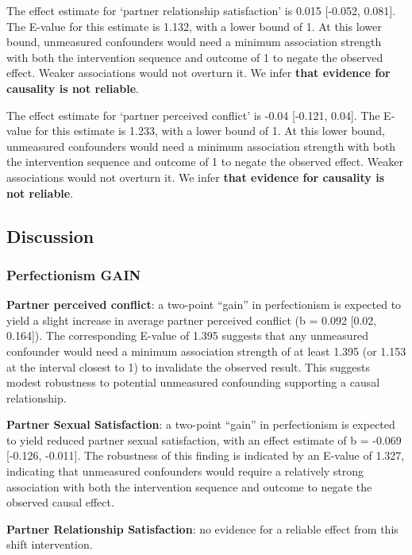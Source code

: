 \documentclass[
  singlecolumn]{article}
\begin{document}
The effect estimate for `partner relationship satisfaction' is 0.015
{[}-0.052, 0.081{]}. The E-value for this estimate is 1.132, with a
lower bound of 1. At this lower bound, unmeasured confounders would need
a minimum association strength with both the intervention sequence and
outcome of 1 to negate the observed effect. Weaker associations would
not overturn it. We infer \textbf{that evidence for causality is not
reliable}.

The effect estimate for `partner perceived conflict' is -0.04 {[}-0.121,
0.04{]}. The E-value for this estimate is 1.233, with a lower bound of
1. At this lower bound, unmeasured confounders would need a minimum
association strength with both the intervention sequence and outcome of
1 to negate the observed effect. Weaker associations would not overturn
it. We infer \textbf{that evidence for causality is not reliable}.

\subsection{Discussion}\label{discussion}

\subsubsection{Perfectionism GAIN}\label{perfectionism-gain}

\textbf{Partner perceived conflict}: a two-point ``gain'' in
perfectionism is expected to yield a slight increase in average partner
perceived conflict (b = 0.092 {[}0.02, 0.164{]}). The corresponding
E-value of 1.395 suggests that any unmeasured confounder would need a
minimum association strength of at least 1.395 (or 1.153 at the interval
closest to 1) to invalidate the observed result. This suggests modest
robustness to potential unmeasured confounding supporting a causal
relationship.

\textbf{Partner Sexual Satisfaction}: a two-point ``gain'' in
perfectionism is expected to yield reduced partner sexual satisfaction,
with an effect estimate of b = -0.069 {[}-0.126, -0.011{]}. The
robustness of this finding is indicated by an E-value of 1.327,
indicating that unmeasured confounders would require a relatively strong
association with both the intervention sequence and outcome to negate
the observed causal effect.

\textbf{Partner Relationship Satisfaction}: no evidence for a reliable
effect from this shift intervention.
\end{document}
